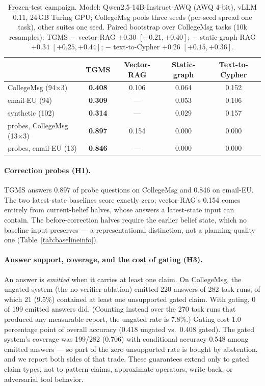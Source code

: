 \documentclass[11pt]{article}
\begin{document}
\begin{table}[t]
\centering\small
\caption{Frozen-test campaign. Model: Qwen2.5-14B-Instruct-AWQ (AWQ
4-bit), vLLM 0.11, 24\,GB Turing GPU; CollegeMsg pools three seeds
(per-seed spread one task), other suites one seed. Paired bootstrap
over CollegeMsg tasks (10k resamples): TGMS $-$ vector-RAG $+0.30$
$[+0.21,+0.40]$; $-$ static-graph RAG $+0.34$ $[+0.25,+0.44]$; $-$
text-to-Cypher $+0.26$ $[+0.15,+0.36]$.}
\label{tab:frozen}
\begin{tabular}{lcccc}
\toprule
 & TGMS & Vector-RAG & Static-graph & Text-to-Cypher \\
\midrule
CollegeMsg (94$\times$3) & \textbf{0.408} & 0.106 & 0.064 & 0.152 \\
email-EU (94) & \textbf{0.309} & --- & 0.053 & 0.106 \\
synthetic (102) & \textbf{0.314} & --- & 0.029 & 0.157 \\
probes, CollegeMsg (13$\times$3) & \textbf{0.897} & 0.154 & 0.000 & 0.000 \\
probes, email-EU (13) & \textbf{0.846} & --- & 0.000 & 0.000 \\
\bottomrule
\end{tabular}
\end{table}

\paragraph{Correction probes (H1).}
TGMS answers 0.897 of probe questions on CollegeMsg and 0.846 on
email-EU. The two latest-state baselines score exactly zero;
vector-RAG's 0.154 comes entirely from current-belief halves, whose
answers a latest-state input can contain. The before-correction halves
require the earlier belief state, which no baseline input preserves ---
a representational distinction, not a planning-quality one
(Table~\ref{tab:baselineinfo}).

\paragraph{Answer support, coverage, and the cost of gating (H3).}
An answer is \emph{emitted} when it carries at least one claim. On
CollegeMsg, the ungated system (the no-verifier ablation) emitted 220
answers of 282 task runs, of which 21 (9.5\%) contained at least one
unsupported gated claim. With gating, 0 of 199 emitted answers did.
(Counting instead over the 270 task runs that produced any measurable
report, the ungated rate is 7.8\%.) Gating cost 1.0 percentage point of overall
accuracy (0.418 ungated vs.\ 0.408 gated). The gated system's coverage
was 199/282 (0.706) with conditional accuracy 0.548 among emitted
answers --- so part of the zero unsupported rate is bought by
abstention, and we report both sides of that trade. These guarantees
extend only to gated claim types, not to pattern claims, approximate
operators, write-back, or adversarial tool behavior.
\end{document}

